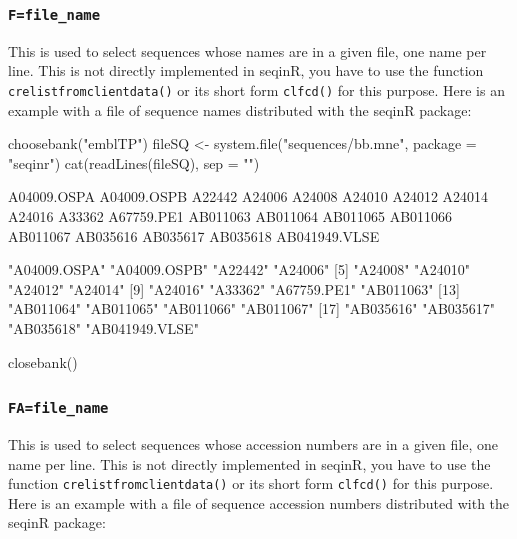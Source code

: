 \documentclass{article}
\begin{document}
\subsubsection{\texttt{F=file\_name}}

This is used to select sequences whose names are in a given file, one name per line.
This is not directly implemented in seqinR, you have to use the function
\texttt{crelistfromclientdata()} or its short form \texttt{clfcd()} for this purpose. Here is an example with
a file of sequence names distributed with the seqinR package:

\begin{Schunk}
\begin{Sinput}
 choosebank("emblTP")
 fileSQ <- system.file("sequences/bb.mne", package = "seqinr")
 cat(readLines(fileSQ), sep = "\n")
\end{Sinput}
\begin{Soutput}
A04009.OSPA
A04009.OSPB
A22442
A24006
A24008
A24010
A24012
A24014
A24016
A33362
A67759.PE1
AB011063
AB011064
AB011065
AB011066
AB011067
AB035616
AB035617
AB035618
AB041949.VLSE
\end{Soutput}
\begin{Soutput}
 [1] "A04009.OSPA"   "A04009.OSPB"   "A22442"        "A24006"       
 [5] "A24008"        "A24010"        "A24012"        "A24014"       
 [9] "A24016"        "A33362"        "A67759.PE1"    "AB011063"     
[13] "AB011064"      "AB011065"      "AB011066"      "AB011067"     
[17] "AB035616"      "AB035617"      "AB035618"      "AB041949.VLSE"
\end{Soutput}
\begin{Sinput}
 closebank()
\end{Sinput}
\end{Schunk}


\subsubsection{\texttt{FA=file\_name}}

This is used to select sequences whose accession numbers are in a given file, one name per line.
This is not directly implemented in seqinR, you have to use the function
\texttt{crelistfromclientdata()} or its short form \texttt{clfcd()} for this purpose. Here is an example with
a file of sequence accession numbers distributed with the seqinR package:
\end{document}
